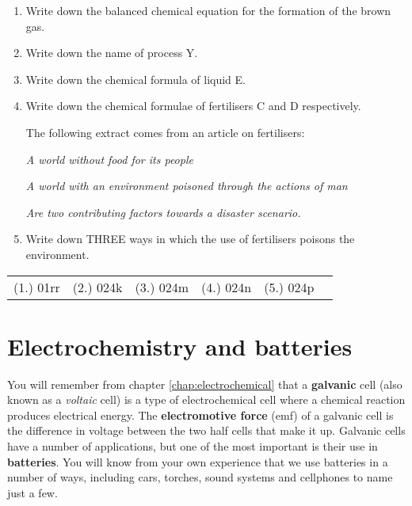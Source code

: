 {\begin{enumerate}
\item{Write down the balanced chemical equation for the formation of the brown gas.}
\item{Write down the name of process Y.}
\item{Write down the chemical formula of liquid E.}
\item{Write down the chemical formulae of fertilisers C and D respectively.}

The following extract comes from an article on fertilisers:
\begin{center}
\textit{A world without food for its people}

\textit{A world with an environment poisoned through the actions of man }

\textit{Are two contributing factors towards a disaster scenario.}

\end{center}

\item{Write down THREE ways in which the use of fertilisers poisons the environment.}
\end{enumerate}

\par \practiceinfo
\par \begin{tabular}[h]{cccccc}
(1.)	01rr	&
(2.) 024k	&
(3.) 024m	&
(4.) 024n	&
(5.) 024p	&
\end{tabular}

}

\section{Electrochemistry and batteries}
\label{sec:chemindustry:batteries}

You will remember from chapter \ref{chap:electrochemical} that a \textbf{galvanic} cell (also known as a \textit{voltaic} cell) is a type of electrochemical cell where a chemical reaction produces electrical energy. The \textbf{electromotive force} (emf) of a galvanic cell is the difference in voltage between the two half cells that make it up. Galvanic cells have a number of applications, but one of the most important is their use in \textbf{batteries}. You will know from your own experience that we use batteries in a number of ways, including cars, torches, sound systems and cellphones to name just a few.

